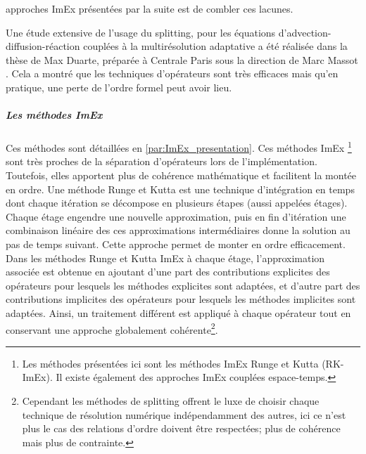             approches ImEx présentées par la suite est de combler ces lacunes.\par
            Une étude extensive de l'usage du splitting, pour les équations d'advection-diffusion-réaction couplées à la multirésolution adaptative 
            a été réalisée dans la thèse de Max Duarte, préparée à Centrale Paris sous la direction de Marc Massot \cite{duart2011}.
            Cela a montré que les techniques d'opérateurs sont très efficaces mais qu'en pratique, une perte de l'ordre formel peut avoir lieu.

        \subparagraph{Les méthodes ImEx}
            Ces méthodes sont détaillées en \ref{par:ImEx_presentation}. Ces méthodes ImEx
            \footnote{Les méthodes présentées ici sont les méthodes ImEx Runge et Kutta (RK-ImEx). Il existe également des approches ImEx couplées espace-temps\cite{rebou2024}.}  \cite{pareschi2010implicitexplicitrungekuttaschemesapplications} \cite{KENNEDY2003139}
            sont très proches de la séparation d'opérateurs lors de l'implémentation. Toutefois, elles apportent plus de cohérence mathématique
            et facilitent la montée en ordre. 
            Une méthode Runge et Kutta est une technique d'intégration en temps dont chaque itération se décompose en plusieurs étapes (aussi appelées étages).
            Chaque étage engendre une nouvelle approximation, puis en fin d'itération une combinaison linéaire des ces approximations intermédiaires donne la solution au pas de temps suivant.
            Cette approche permet de monter en ordre efficacement.
            Dans les méthodes Runge et Kutta ImEx à chaque étage, l'approximation associée est obtenue en ajoutant d'une part des contributions explicites des opérateurs pour lesquels les méthodes explicites sont adaptées,
            et d'autre part des contributions implicites des opérateurs pour lesquels les méthodes implicites sont adaptées.
            Ainsi, un traitement différent est appliqué à chaque opérateur tout en conservant une approche globalement cohérente\footnote{Cependant les méthodes de splitting 
            offrent le luxe de choisir chaque technique de résolution numérique indépendamment des autres, ici ce n'est plus le cas des relations d'ordre doivent être respectées;
            plus de cohérence mais plus de contrainte.}.

